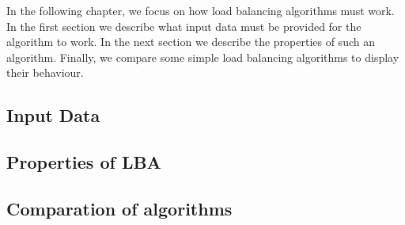 In the following chapter, we focus on how load balancing algorithms must work.
In the first section we describe what input data must be provided for the
algorithm to work.
In the next section we describe the properties of such an algorithm.
Finally, we compare some simple load balancing algorithms to display their
behaviour.

\subsection{Input Data}
\label{sec:algo:input}


\subsection{Properties of \ac{LBA}}
\label{sec:algo:prop}
%

\subsection{Comparation of algorithms}
\label{sec:algo:comp}
